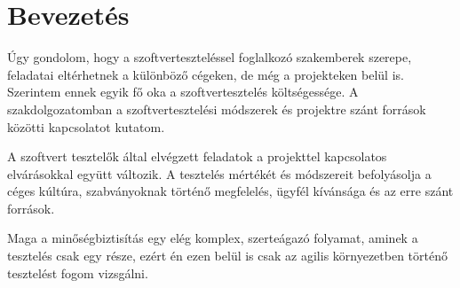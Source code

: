 \section{Bevezetés}
Úgy gondolom, hogy a szoftverteszteléssel foglalkozó szakemberek szerepe, feladatai eltérhetnek a különböző cégeken, de még a projekteken belül is.
Szerintem ennek egyik fő oka a szoftvertesztelés költségessége. A szakdolgozatomban a szoftvertesztelési módszerek és projektre szánt források közötti kapcsolatot kutatom.

A szoftvert tesztelők által elvégzett feladatok a projekttel kapcsolatos elvárásokkal együtt változik.
A tesztelés mértékét és módszereit befolyásolja a céges kúltúra, szabványoknak történő megfelelés, ügyfél kívánsága és az erre szánt források.

Maga a minőségbiztisítás egy elég komplex, szerteágazó folyamat, aminek a tesztelés csak egy része, ezért én ezen belül is csak az agilis környezetben történő tesztelést fogom vizsgálni.